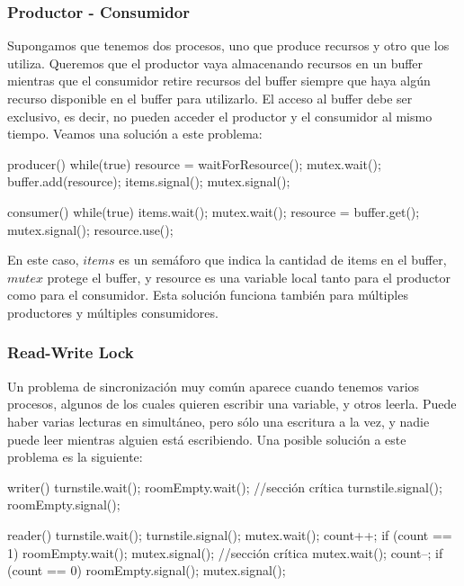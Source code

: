 \documentclass{article}
\begin{document}
\subsubsection{Productor - Consumidor}

Supongamos que tenemos dos procesos, uno que produce recursos y otro que los utiliza. Queremos que el productor vaya almacenando recursos en un buffer mientras que el consumidor retire recursos del buffer siempre que haya alg\'un recurso disponible en el buffer para utilizarlo. El acceso al buffer debe ser exclusivo, es decir, no pueden acceder el productor y el consumidor al mismo tiempo. Veamos una soluci\'on a este problema:

\begin{code}
producer()
{
    while(true)
		{
        resource = waitForResource();
    		mutex.wait();
		        buffer.add(resource);
				    items.signal();
	      mutex.signal();
		}
}

consumer()
{
    while(true)
		{
		    items.wait();
				mutex.wait();
				    resource = buffer.get();
			  mutex.signal();
				resource.use();
		}
}
\end{code}

En este caso, $items$ es un sem\'aforo que indica la cantidad de items en el buffer, $mutex$ protege el buffer, y resource es una variable local tanto para el productor como para el consumidor. Esta soluci\'on funciona tambi\'en para m\'ultiples productores y m\'ultiples consumidores.

\subsubsection{Read-Write Lock}

Un problema de sincronizaci\'on muy com\'un aparece cuando tenemos varios procesos, algunos de los cuales quieren escribir una variable, y otros leerla. Puede haber varias lecturas en simult\'aneo, pero s\'olo una escritura a la vez, y nadie puede leer mientras alguien est\'a escribiendo. Una posible soluci\'on a este problema es la siguiente:

\begin{code}
writer()
{
    turnstile.wait();
		    roomEmpty.wait();
				//sección crítica
		turnstile.signal();
		roomEmpty.signal();
}

reader()
{
    turnstile.wait();
		turnstile.signal();
		mutex.wait();
		    count++;
				if (count == 1)
				    roomEmpty.wait();
		mutex.signal();
		//sección crítica
		mutex.wait();
		    count--;
				if (count == 0)
				    roomEmpty.signal();
	  mutex.signal();
}
\end{code}
\end{document}
